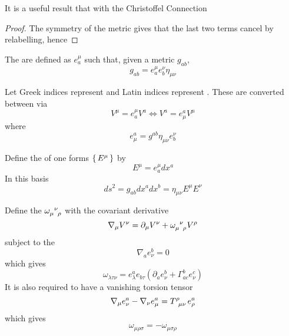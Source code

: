 \documentclass{article}
\begin{document}
\begin{lemma}
It is a useful result that 
with the Christoffel Connection
\end{lemma}
\begin{proof}
The symmetry of the metric gives that the last two terms cancel by relabelling, hence 
\end{proof}


\begin{definition}
The  are defined as $e^\mu_a$ such that, given a metric $g_{ab}$,
\[
g_{ab} = e^\mu_a e^\nu_b \eta_{\mu\nu}
\]
\end{definition}

\begin{definition}
Let Greek indices represent  and Latin indices represent . These are converted between via 
\[
V^\mu = e^\mu_a V^a \Leftrightarrow V^a = e^a_\mu V^\mu
\]
where 
\[
e^a_\mu=g^{ab} \eta_{\mu\nu} e^\nu_b
\]
\end{definition}

\begin{definition}
Define the  of one forms $\set{E^\mu}$ by 
\[
E^\mu = e^\mu_a dx^a
\]
In this basis 
\[
ds^2 = g_{ab} dx^a dx^b = \eta_{\mu\nu} E^{\mu} E^{\nu}
\]
\end{definition}


\begin{definition}
Define the  $\omega\indices{_\mu^\nu_\rho}$ with the covariant derivative 
\[
\nabla_\mu V^\nu = \del_\mu V^\nu + \omega\indices{_\mu^\nu_\rho} V^\rho
\]
subject to the 
\[
\nabla_a e^b_\nu = 0
\]
which gives
\[
\omega_{\lambda\tau\nu} =e_\lambda^a e_{b\tau}\left(\partial_a e_\nu^b+\Gamma_{ac}^b e_\nu^c \right)
\]
It is also required to have a vanishing torsion tensor 
\[
\nabla_\mu e^a_\nu - \nabla_\nu e^a_\mu = T\indices{^\rho_\mu_\nu} e^a_\rho
\]
which gives 
\[
\omega_{\mu\rho\sigma} = -\omega_{\mu\sigma\rho}
\]
\end{definition}
\end{document}
